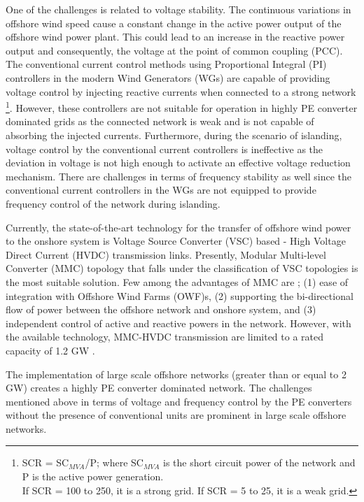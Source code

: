 One of the challenges is related to voltage stability. The continuous variations in offshore wind speed cause a constant change in the active power output of the offshore wind power plant. This could lead to an increase in the reactive power output and consequently, the voltage at the point of common coupling (\gls{PCC}). The conventional current control methods using Proportional Integral (\gls{PI}) controllers in the modern Wind Generators (\gls{WG}s) are capable of providing voltage control by injecting reactive currents when connected to a strong network \footnote{SCR = SC$_{MVA}$/P;\; where SC$_{MVA}$ is the short circuit power of the network and P is the active power generation. \\
If SCR = 100 to 250, it is a strong grid. If SCR = 5 to 25, it is a weak grid.}. However, these controllers are not suitable for operation in highly \gls{PE} converter dominated grids as the connected network is weak and is not capable of absorbing the injected currents. Furthermore, during the scenario of islanding, voltage control by the conventional current controllers is ineffective as the deviation in voltage is not high enough to activate an effective voltage reduction mechanism. There are challenges in terms of frequency stability as well since the conventional current controllers in the \gls{WG}s are not equipped to provide frequency control of the network during islanding. 

Currently, the state-of-the-art technology for the transfer of offshore wind power to the onshore system is Voltage Source Converter (\gls{VSC}) based  - High Voltage Direct Current (\gls{HVDC}) transmission links. Presently, Modular Multi-level Converter (\gls{MMC}) topology that falls under the classification of \gls{VSC} topologies is the most suitable solution. Few among the advantages of \gls{MMC} are \cite{cigre_B455}; (1) ease of integration with Offshore Wind Farms (\gls{OWF})s, (2) supporting the bi-directional flow of power between the offshore network and onshore system, and (3) independent control of active and reactive powers in the network. However, with the available technology, \gls{MMC}-\gls{HVDC} transmission are limited to a rated capacity of 1.2 GW \cite{peralta2012detailed}.

The implementation of large scale offshore networks (greater than or equal to 2 GW) creates a highly \gls{PE} converter dominated network. The challenges mentioned above in terms of voltage and frequency control by the \gls{PE} converters without the presence of conventional units are prominent in large scale offshore networks. 

